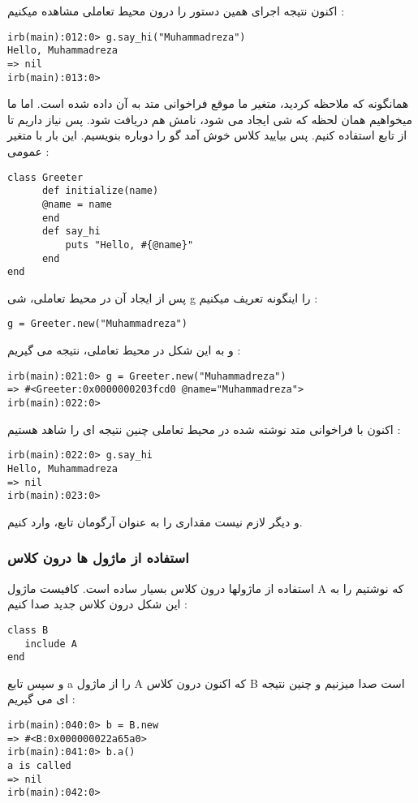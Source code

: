 \documentclass[11pt]{article}
\begin{document}
اکنون نتیجه اجرای همین دستور را درون محیط تعاملی مشاهده میکنیم :
\begin{latin}
\begin{verbatim}
irb(main):012:0> g.say_hi("Muhammadreza")
Hello, Muhammadreza
=> nil
irb(main):013:0> 
\end{verbatim}
\end{latin}
همانگونه که ملاحظه کردید، متغیر ما موقع فراخوانی متد به آن داده شده است. اما ما میخواهیم همان لحظه که شی ایجاد می شود، نامش هم دریافت شود. پس نیاز داریم تا از تابع 
استفاده کنیم. پس بیایید کلاس خوش آمد گو را دوباره بنویسیم. این بار با متغیر عمومی :
\begin{latin}
\begin{verbatim}
class Greeter
      def initialize(name)
      @name = name
      end
      def say_hi
          puts "Hello, #{@name}"
      end
end
\end{verbatim}
\end{latin}

پس از ایجاد آن در محیط تعاملی، شی g را اینگونه تعریف میکنیم :
\begin{latin}
\begin{verbatim}
g = Greeter.new("Muhammadreza")
\end{verbatim}
\end{latin}

و به این شکل در محیط تعاملی، نتیجه می گیریم :
\begin{latin}
\begin{verbatim}
irb(main):021:0> g = Greeter.new("Muhammadreza")
=> #<Greeter:0x0000000203fcd0 @name="Muhammadreza">
irb(main):022:0>
\end{verbatim}
\end{latin}
اکنون با فراخوانی متد نوشته شده در محیط تعاملی چنین نتیجه ای را شاهد هستیم :
\begin{latin}
\begin{verbatim}
irb(main):022:0> g.say_hi
Hello, Muhammadreza
=> nil
irb(main):023:0>
\end{verbatim}
\end{latin}
و دیگر لازم نیست مقداری را به عنوان آرگومان تابع، وارد کنیم.
\subsubsection{استفاده از ماژول ها درون کلاس}
استفاده از ماژولها درون کلاس بسیار ساده است. کافیست ماژول A که نوشتیم را به این شکل درون کلاس جدید صدا کنیم :
\begin{latin}
\begin{verbatim}
class B
   include A
end
\end{verbatim}
\end{latin}
و سپس تابع a را از ماژول A که اکنون درون کلاس B است صدا میزنیم و چنین نتیجه ای می گیریم :
\begin{latin}
\begin{verbatim}
irb(main):040:0> b = B.new
=> #<B:0x000000022a65a0>
irb(main):041:0> b.a()
a is called
=> nil
irb(main):042:0> 
\end{verbatim}
\end{latin}
\end{document}
